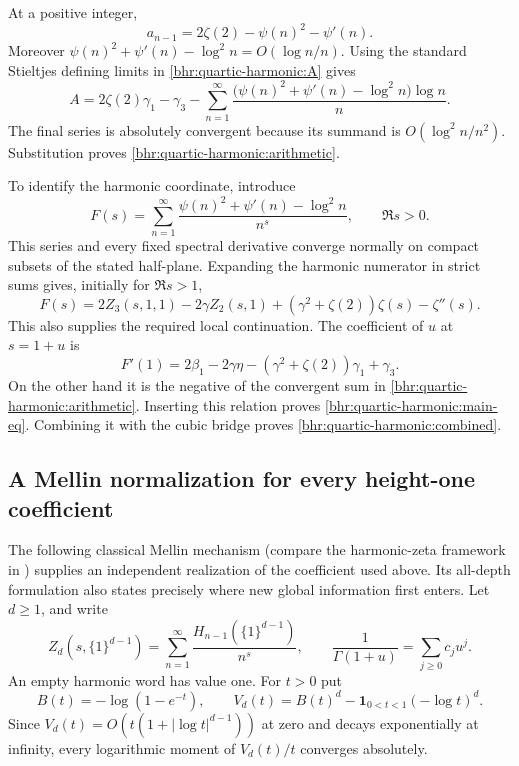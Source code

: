 \documentclass[11pt]{article}
\numberwithin{equation}{section}
\theoremstyle{plain}
\theoremstyle{definition}
\theoremstyle{remark}
\begin{document}
At a positive integer,
\[
 a_{n-1}=2\zeta(2)-\psi(n)^2-\psi'(n).
\]
Moreover $\psi(n)^2+\psi'(n)-\log^2n=O(\log n/n)$.
Using the standard Stieltjes defining limits in
\eqref{bhr:quartic-harmonic:A} gives
\[
 A=2\zeta(2)\gamma_1-\gamma_3
   -\sum_{n=1}^{\infty}
          \frac{\bigl(\psi(n)^2+\psi'(n)-\log^2n\bigr)\log n}{n}.
\]
The final series is absolutely convergent because its summand is
$O(\log^2n/n^2)$. Substitution proves
\eqref{bhr:quartic-harmonic:arithmetic}.

To identify the harmonic coordinate, introduce
\[
 F(s)=\sum_{n=1}^{\infty}
    \frac{\psi(n)^2+\psi'(n)-\log^2n}{n^s},\qquad\Re s>0.
\]
This series and every fixed spectral derivative converge normally
on compact subsets of the stated half-plane. Expanding the harmonic
numerator in strict sums gives, initially for $\Re s>1$,
\begin{equation}
 F(s)=2Z_3(s,1,1)-2\gamma Z_2(s,1)
                   +(\gamma^2+\zeta(2))\zeta(s)-\zeta''(s).
 \label{bhr:quartic-harmonic:deformation}
\end{equation}
This also supplies the required local continuation. The coefficient
of $u$ at $s=1+u$ is
\[
 F'(1)=2\beta_1-2\gamma\eta
                 -(\gamma^2+\zeta(2))\gamma_1+\gamma_3.
\]
On the other hand it is the negative of the convergent sum in
\eqref{bhr:quartic-harmonic:arithmetic}. Inserting this relation proves
\eqref{bhr:quartic-harmonic:main-eq}. Combining it with the cubic bridge
proves \eqref{bhr:quartic-harmonic:combined}.

\subsection{A Mellin normalization for every height-one coefficient}

The following classical Mellin mechanism (compare the harmonic-zeta framework in \cite{bhr:Kargin}) supplies an independent
realization of the coefficient used above. Its all-depth formulation
also states precisely where new global information first enters.
Let $d\ge1$, and write
\[
 Z_d(s,\{1\}^{d-1})
   =\sum_{n=1}^{\infty}\frac{H_{n-1}(\{1\}^{d-1})}{n^s},
 \qquad
 \frac1{\Gamma(1+u)}=\sum_{j\ge0}c_ju^j.
\]
An empty harmonic word has value one. For $t>0$ put
\[
 B(t)=-\log(1-e^{-t}),\qquad
 V_d(t)=B(t)^d-\mathbf1_{0<t<1}(-\log t)^d.
\]
Since $V_d(t)=O(t(1+|\log t|^{d-1}))$ at zero and decays
exponentially at infinity, every logarithmic moment of $V_d(t)/t$
converges absolutely.
\end{document}

